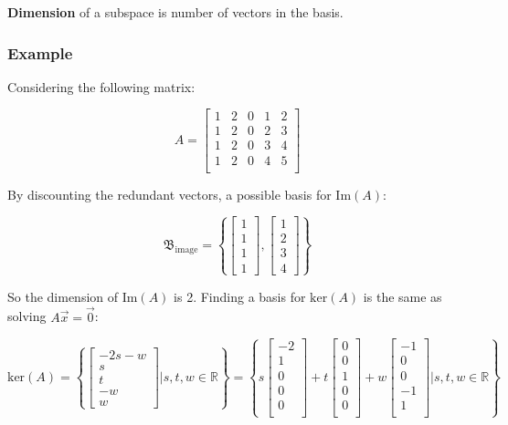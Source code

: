 \textbf{Dimension} of a subspace is number of vectors in the basis.

\subsubsection{Example}

Considering the following matrix:

\[A=\begin{bmatrix}
    1&2&0&1&2\\
    1&2&0&2&3\\
    1&2&0&3&4\\
    1&2&0&4&5\\
    \end{bmatrix}\]

By discounting the redundant vectors, a possible basis for $\mathrm{Im}(A)$:

\[\mathfrak{B}_\mathrm{image}=\left \{\begin{bmatrix} 1\\1\\1\\1 \end{bmatrix},\begin{bmatrix}1\\2\\3\\4 \end{bmatrix} \right\}\]

So the dimension of $\mathrm{Im}(A)$ is 2.
Finding a basis for $\mathrm{ker}(A)$ is the same as solving $A\vec{x}=\vec{0}$:

\[\mbox{ker}(A)=\left\{\begin{bmatrix}-2s-w\\ s\\t\\-w\\w \end{bmatrix} \Bigg| s,t,w\in\mathbb{R} \right\}=
\left\{s\begin{bmatrix}-2\\1\\0\\0\\0\\\end{bmatrix}+t\begin{bmatrix}0\\0\\1\\0\\0\\\end{bmatrix}+w\begin{bmatrix}-1\\0\\0\\-1\\1\\\end{bmatrix}\Bigg|s,t,w\in\mathbb{R}\right\}\]

